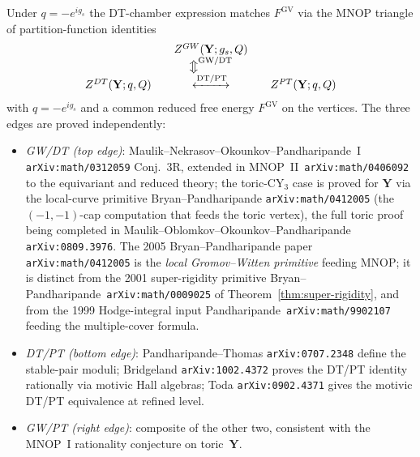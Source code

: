 \documentclass[11pt]{amsart}
\theoremstyle{definition}
\providecommand{\bY}{\mathbf{Y}}
\begin{document}
Under $q = -e^{i g_s}$ the DT-chamber expression matches $F^{\mathrm{GV}}$
via the MNOP triangle of partition-function identities
\[
\begin{array}{c@{\qquad}c@{\qquad}c}
 & Z^{\mathrm{GW}}(\bY; g_s, Q) & \\
 & \big\Updownarrow^{\text{GW/DT}} & \\
Z^{\mathrm{DT}}(\bY; q, Q) & \xleftrightarrow{\text{DT/PT}} &
 Z^{\mathrm{PT}}(\bY; q, Q)
\end{array}
\]
with $q = -e^{i g_s}$ and a common reduced free energy
$F^{\mathrm{GV}}$ on the vertices. The three edges are proved
independently:
\begin{itemize}[leftmargin=2em]
\item \emph{GW/DT (top edge)}: Maulik--Nekrasov--Okounkov--Pandharipande~I
  \texttt{arXiv:math/0312059} Conj.~3R, extended in
  MNOP~II~\texttt{arXiv:math/0406092} to the equivariant and reduced
  theory; the toric-CY$_3$ case is proved for $\bY$ via the local-curve
  primitive Bryan--Pandharipande \texttt{arXiv:math/0412005} (the
  $(-1,-1)$-cap computation that feeds the toric vertex), the full
  toric proof being completed in Maulik--Oblomkov--Okounkov--Pandharipande
  \texttt{arXiv:0809.3976}. The 2005 Bryan--Pandharipande paper
  \texttt{arXiv:math/0412005} is the \emph{local Gromov--Witten primitive}
  feeding MNOP; it is distinct from the 2001 super-rigidity primitive
  Bryan--Pandharipande~\texttt{arXiv:math/0009025} of
  Theorem~\ref{thm:super-rigidity}, and from the 1999 Hodge-integral
  input Pandharipande~\texttt{arXiv:math/9902107} feeding the
  multiple-cover formula.
\item \emph{DT/PT (bottom edge)}: Pandharipande--Thomas
  \texttt{arXiv:0707.2348} define the stable-pair moduli; Bridgeland
  \texttt{arXiv:1002.4372} proves the DT/PT identity rationally via
  motivic Hall algebras; Toda \texttt{arXiv:0902.4371} gives the
  motivic DT/PT equivalence at refined level.
\item \emph{GW/PT (right edge)}: composite of the other two, consistent
  with the MNOP~I rationality conjecture on toric~$\bY$.
\end{itemize}
\end{document}
